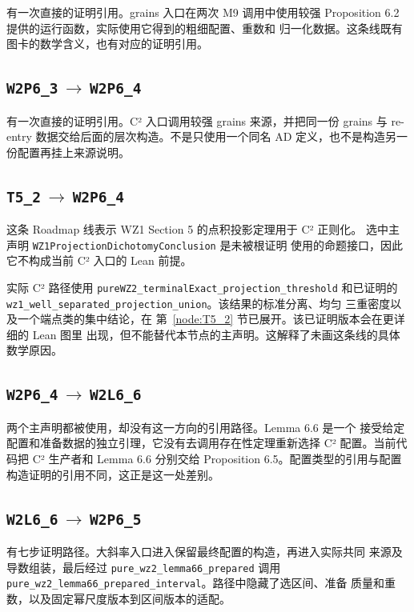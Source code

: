 \documentclass[UTF8,11pt,a4paper,fontset=none]{ctexart}
\DeclareRobustCommand{\id}[1]{\nolinkurl{#1}}
\newcommand{\arr}[2]{\id{#1}\,$\longrightarrow$\,\id{#2}}
\begin{document}
有一次直接的证明引用。grains 入口在两次 M9 调用中使用较强
Proposition 6.2 提供的运行函数，实际使用它得到的粗细配置、重数和
归一化数据。这条线既有图卡的数学含义，也有对应的证明引用。

\subsection{\texorpdfstring{\arr{W2P6_3}{W2P6_4}}{W2P6\_3 到 W2P6\_4}}

有一次直接的证明引用。C² 入口调用较强 grains 来源，并把同一份
grains 与 re-entry 数据交给后面的层次构造。不是只使用一个同名
AD 定义，也不是构造另一份配置再挂上来源说明。

\subsection{\texorpdfstring{\arr{T5_2}{W2P6_4}}{T5\_2 到 W2P6\_4}}

这条 Roadmap 线表示 WZ1 Section 5 的点积投影定理用于 C² 正则化。
选中主声明 \id{WZ1ProjectionDichotomyConclusion} 是未被根证明
使用的命题接口，因此它不构成当前 C² 入口的 Lean 前提。

实际 C² 路径使用
\id{pureWZ2_terminalExact_projection_threshold} 和已证明的
\id{wz1_well_separated_projection_union}。该结果的标准分离、均匀
三重密度以及一个端点类的集中结论，在
第~\ref{node:T5_2} 节已展开。该已证明版本会在更详细的 Lean 图里
出现，但不能替代本节点的主声明。这解释了未画这条线的具体数学原因。

\subsection{\texorpdfstring{\arr{W2P6_4}{W2L6_6}}{W2P6\_4 到 W2L6\_6}}

两个主声明都被使用，却没有这一方向的引用路径。Lemma 6.6 是一个
接受给定配置和准备数据的独立引理，它没有去调用存在性定理重新选择
C² 配置。当前代码把 C² 生产者和 Lemma 6.6 分别交给 Proposition
6.5。配置类型的引用与配置构造证明的引用不同，这正是这一处差别。

\subsection{\texorpdfstring{\arr{W2L6_6}{W2P6_5}}{W2L6\_6 到 W2P6\_5}}

有七步证明路径。大斜率入口进入保留最终配置的构造，再进入实际共同
来源及导数组装，最后经过 \id{pure_wz2_lemma66_prepared} 调用
\id{pure_wz2_lemma66_prepared_interval}。路径中隐藏了选区间、准备
质量和重数，以及固定幂尺度版本到区间版本的适配。
\end{document}
